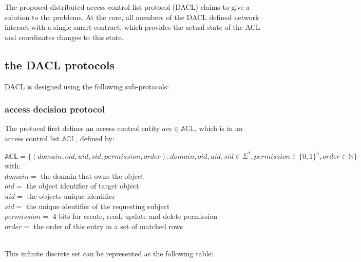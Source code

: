 \documentclass[12pt, conference]{IEEEtran}
\begin{document}
The proposed distributed access control list protocol (DACL) claims to give a solution to the problems. At the core, all members of the DACL defined network interact with a single smart contract, which provides the actual state of the ACL and coordinates changes to this state. 

\newpage

\subsection{the DACL protocols}

DACL is designed using the following sub-protocols:

\subsubsection{access decision protocol}

The protocol first defines an access control entity $ ace \in \mathbb{ACL} $, which is in an access control list $ \mathbb{ACL} $, defined by:
\begin{footnotesize}
$
\mathbb{ACL} = \{ (domain, oid, uid, sid, permission, order) : domain, oid, uid, sid \in \Sigma^*,  permission \in \{0,1\}^4, order \in \mathbb{N} \} 
 $
 with: \\
 $ domain = $ the domain that owns the object  \\
 $ oid = $ the object identifier of target object \\
 $ uid = $ the objects unique identifier \\
 $ sid = $ the unique identifier of the requesting subject \\
 $ permission = $ 4 bits for create, read, update and delete permission \\
 $ order = $ the order of this entry in a set of matched rows \\
 \\
\end{footnotesize}
This infinite discrete set can be represented as the following table:
\end{document}
